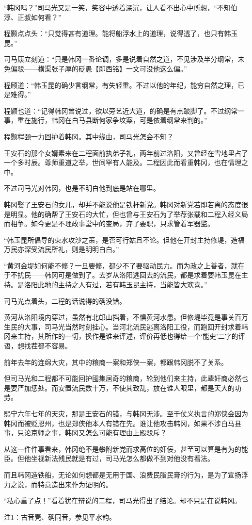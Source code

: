 “韩冈吗？”司马光又是一笑，笑容中透着深沉，让人看不出心中所想，“不知伯淳、正叔如何看？”

程颢点点头：“只觉得甚有道理。能将船浮水上的道理，说得透了，也只有韩玉昆。”

司马康立刻道：“只是韩冈一番论调，多是说着自然之道，不见涉及半分纲常，未免偏驳——横渠张子厚的砭愚【即西铭】一文可没他这么偏。”

程颐道：“韩玉昆的确少言纲常，有失轻重。不过以他的年纪，能穷自然之理，已是难得。”

程颢也道：“记得韩冈曾说过，欲以旁艺近大道，的确是有点跛脚了。不过纲常一事，重在施行，韩冈在白马县断何家争坟案，可是依着纲常来判的。”

程颢程颐一力回护着韩冈。其中缘由，司马光怎会不知？

王安石的那个女婿素来在二程面前执弟子礼，两年前过洛阳，又曾经在雪地里占了一个多时辰。尊师重道之举，世间罕有人能及。二程因此而看重韩冈，也在情理之中。

不过司马光对韩冈，也是不明白他到底是站在哪里。

韩冈娶了王安石的女儿，却并不能说他是铁杆新党。韩冈对新党若即若离的态度很是明显。他的确帮了王安石的大忙，但也曾与王安石为了举荐张载和二程入经义局而相争。如今更是不理政事堂中的变局，弃了要职，只求管着军器监。

“韩玉昆所倡导的束水攻沙之策，是否可行姑且不论。但他在开封主持修堤，造福万民亦深受流民所礼，则是明明白白。”

“黄河金堤如何能不修？一旦要修，都少不了要驱动民力。而为政之上善者，就在于不扰民——韩冈可是做到了。去岁从洛阳逃回去的流民，都是求着要韩玉昆在主持。是洛阳此地的主持之人有过，若有韩玉昆主持，当能皆大欢喜。”

司马光点着头，二程的话说得的确没错。

黄河从洛阳境内穿过，虽然有北邙山挡着，不惧黄河水患。但修堤毕竟是事关百万生民的大事，司马光当然时刻挂心。当河北流民逃离洛阳工役，而跑回开封求着韩冈来主持，其所作的一切，换作是谁来评述，评价再低也得给一个‘能吏’二字的评语，想找茬都不容易。

前年去年的连绵大灾，其中的粮商一案和郑侠一案，都跟韩冈脱不了关系。

但司马光和二程都不可能回护囤集居奇的粮商，轮到他们来主持，此辈奸商必然也是要严加惩处。而安置流民数十万，不使其致乱，放在谁人眼里，都是天大的功劳。

熙宁六年七年的天灾，那是王安石的错，与韩冈无涉。至于仗义执言的郑侠会因为韩冈而被贬恩州，也是郑侠他本人有错在先。谁让他攻击韩冈，如果不涉白马县事，只论京师之事，韩冈又怎么可能有理由上殿驳斥？

从这一件件事看来，韩冈绝不是攀附新党而求高位的奸佞，甚至可以算是有为的能臣。但他坐视新法残民就是有过，司马光怎么都做不到对他没有看法。

而且韩冈造铁船，无论如何想都是无用于国、浪费民脂民膏的行为，是为了宣扬浮力之说，而特意造出来作为证明的。

“私心重了点！”看着犹在辩说的二程，司马光得出了结论。却不只是在说韩冈。

注1：古音壳、确同音，参见平水韵。

